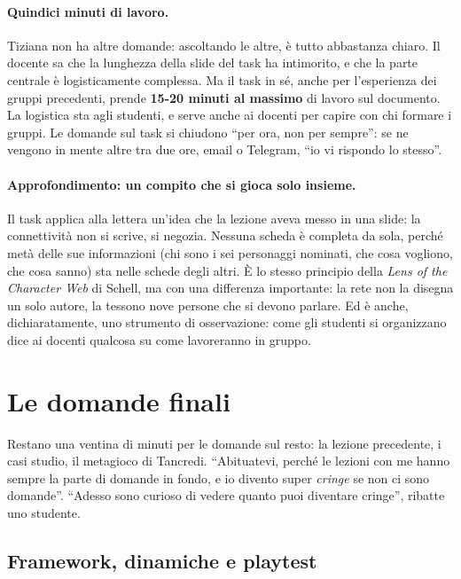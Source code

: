 \paragraph{Quindici minuti di lavoro.} Tiziana non ha altre domande: ascoltando le
altre, è tutto abbastanza chiaro. Il docente sa che la lunghezza della slide del task
ha intimorito, e che la parte centrale è logisticamente complessa. Ma il task in sé,
anche per l'esperienza dei gruppi precedenti, prende \textbf{15-20 minuti al
massimo} di lavoro sul documento. La logistica sta agli studenti, e serve anche ai
docenti per capire con chi formare i gruppi. Le domande sul task si chiudono ``per
ora, non per sempre'': se ne vengono in mente altre tra due ore, email o Telegram,
``io vi rispondo lo stesso''.

\paragraph{Approfondimento: un compito che si gioca solo insieme.} Il task applica
alla lettera un'idea che la lezione aveva messo in una slide: la connettività non si
scrive, si negozia. Nessuna scheda è completa da sola, perché metà delle sue
informazioni (chi sono i sei personaggi nominati, che cosa vogliono, che cosa
sanno) sta nelle schede degli altri. È lo stesso principio della \emph{Lens of the
Character Web} di Schell, ma con una differenza importante: la rete non la disegna un
solo autore, la tessono nove persone che si devono parlare. Ed è anche, dichiaratamente,
uno strumento di osservazione: come gli studenti si organizzano dice ai docenti
qualcosa su come lavoreranno in gruppo.

\section{Le domande finali}
\label{a4:sec:domande}

Restano una ventina di minuti per le domande sul resto: la lezione precedente, i casi
studio, il metagioco di Tancredi. ``Abituatevi, perché le lezioni con me hanno sempre
la parte di domande in fondo, e io divento super \emph{cringe} se non ci sono
domande''. ``Adesso sono curioso di vedere quanto puoi diventare cringe'', ribatte
uno studente.

\subsection{Framework, dinamiche e playtest}

